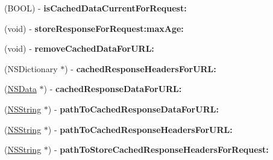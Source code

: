 \begin{DoxyCompactItemize}
\item 
\hypertarget{protocol_a_s_i_cache_delegate-p_a67c31b3473af7adba4cd548045935ac2}{
(\-B\-O\-O\-L) -\/ {\bfseries is\-Cached\-Data\-Current\-For\-Request\-:}}
\label{protocol_a_s_i_cache_delegate-p_a67c31b3473af7adba4cd548045935ac2}

\item 
\hypertarget{protocol_a_s_i_cache_delegate-p_ae7cfacf47d3d24e151530c033f993734}{
(void) -\/ {\bfseries store\-Response\-For\-Request\-:max\-Age\-:}}
\label{protocol_a_s_i_cache_delegate-p_ae7cfacf47d3d24e151530c033f993734}

\item 
\hypertarget{protocol_a_s_i_cache_delegate-p_aa2d162430d8c9bc47057030b3e305f18}{
(void) -\/ {\bfseries remove\-Cached\-Data\-For\-U\-R\-L\-:}}
\label{protocol_a_s_i_cache_delegate-p_aa2d162430d8c9bc47057030b3e305f18}

\item 
\hypertarget{protocol_a_s_i_cache_delegate-p_ab7b267fc153dcf624c91e2d07513f868}{
(\-N\-S\-Dictionary $\ast$) -\/ {\bfseries cached\-Response\-Headers\-For\-U\-R\-L\-:}}
\label{protocol_a_s_i_cache_delegate-p_ab7b267fc153dcf624c91e2d07513f868}

\item 
\hypertarget{protocol_a_s_i_cache_delegate-p_a24c0d2a6834e5a0332f3d95198fc681c}{
(\hyperlink{class_n_s_data}{\-N\-S\-Data} $\ast$) -\/ {\bfseries cached\-Response\-Data\-For\-U\-R\-L\-:}}
\label{protocol_a_s_i_cache_delegate-p_a24c0d2a6834e5a0332f3d95198fc681c}

\item 
\hypertarget{protocol_a_s_i_cache_delegate-p_a692463be3a5c9abe5a239eb761431799}{
(\hyperlink{class_n_s_string}{\-N\-S\-String} $\ast$) -\/ {\bfseries path\-To\-Cached\-Response\-Data\-For\-U\-R\-L\-:}}
\label{protocol_a_s_i_cache_delegate-p_a692463be3a5c9abe5a239eb761431799}

\item 
\hypertarget{protocol_a_s_i_cache_delegate-p_a0cab288cf23b1d6adb76981ed591d324}{
(\hyperlink{class_n_s_string}{\-N\-S\-String} $\ast$) -\/ {\bfseries path\-To\-Cached\-Response\-Headers\-For\-U\-R\-L\-:}}
\label{protocol_a_s_i_cache_delegate-p_a0cab288cf23b1d6adb76981ed591d324}

\item 
\hypertarget{protocol_a_s_i_cache_delegate-p_ab9a190279d92a9fc5d7efeff1efad0ad}{
(\hyperlink{class_n_s_string}{\-N\-S\-String} $\ast$) -\/ {\bfseries path\-To\-Store\-Cached\-Response\-Headers\-For\-Request\-:}}
\label{protocol_a_s_i_cache_delegate-p_ab9a190279d92a9fc5d7efeff1efad0ad}


\end{DoxyCompactItemize}
